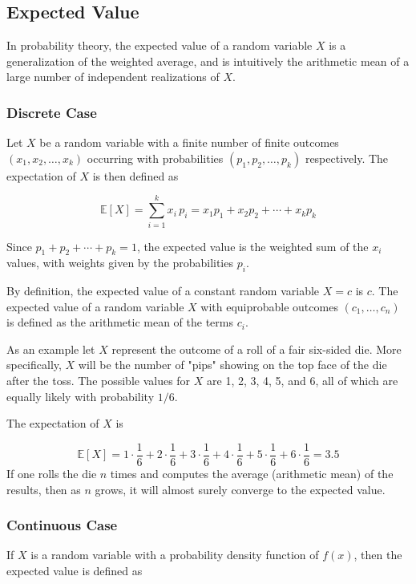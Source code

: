 \subsection{Expected Value}\label{sec:expected-value}

In probability theory, the expected value of a random variable \(X\) is
a generalization of the weighted average, and is intuitively the
arithmetic mean of a large number of independent realizations of \(X\).

\subsubsection{Discrete Case}
Let \(X\) be a random variable with a finite number of finite outcomes
\((x_{1},x_{2},\ldots ,x_{k})\) occurring with probabilities
\((p_{1},p_{2},\ldots ,p_{k})\) respectively. The expectation of \(X\)
is then defined as

\begin{equation}
	\mathbb{E}[X]=\sum _{i=1}^{k}x_{i}\,p_{i}=x_{1}p_{1}+x_{2}p_{2}+\cdots +x_{k}p_{k}
\end{equation}

Since \(p_{1}+p_{2}+\cdots +p_{k}=1\), the expected value is the
weighted sum of the \(x_{i}\) values, with weights given by 
the probabilities \(p_{i}\).

By definition, the expected value of a constant random variable \(X=c\)
is \(c\). The expected value of a random variable \(X\) with
equiprobable outcomes \((c_{1},\ldots ,c_{n})\) is defined as the
arithmetic mean of the terms \(c_i\). 

As an example let \(X\) represent the outcome of a roll of a fair six-sided die. More
specifically, \(X\) will be the number of "pips" showing on the top face
of the die after the toss. The possible values for \(X\) are 1, 2, 3, 4,
5, and 6, all of which are equally likely with probability \(1/6\).

The expectation of \(X\) is

\begin{equation*}
	\mathbb{E}[X]=1\cdot {\frac {1}{6}}+2\cdot {\frac {1}{6}}+3\cdot {\frac {1}{6}}+4\cdot {\frac {1}{6}}+5\cdot {\frac {1}{6}}+6\cdot {\frac {1}{6}}=3.5
\end{equation*}
If one rolls the die \(n\) times and computes the average (arithmetic
mean) of the results, then as \(n\) grows, it will almost
surely converge to the expected value.

\subsubsection{Continuous Case}
If \(X\) is a random variable with a probability density function of
\(f(x)\), then the expected value is defined as

